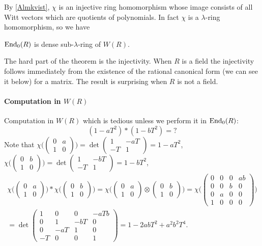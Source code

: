 By \ref{Almkvist}, $\chi$ is an injective ring homomorphism whose image consists of all Witt vectors which are quotients of polynomials. In fact $\chi$ is a $\lambda$-ring homomorphism, so we have
\begin{theorem}
	$\mathrm{End}_0(R)$ is dense sub-$\lambda$-ring of $W(R)$.
\end{theorem}
	The hard part of the theorem is the injectivity. When $R$ is a field the injectivity follows immediately from the existence of the rational canonical form (we can see it below) for a matrix. The result is surprising when $R$ is not a field.
\paragraph{Computation in $W(R)$}
Computation in $W(R)$ which is tedious unless we perform it in $\mathrm{End}_0(R)$:
\[(1-aT^2)*(1-bT^2)=?\]
Note that $\chi\Big(\begin{pmatrix}
	0&a \\1&0
\end{pmatrix}\Big)=\det \begin{pmatrix}
	1&-aT\\-T &1
\end{pmatrix} =1-aT^2$, $\chi\Big(\begin{pmatrix}
	0&b \\1&0
\end{pmatrix}\Big)=\det \begin{pmatrix}
	1&-bT\\-T &1
\end{pmatrix} =1-bT^2$,
\begin{gather*}
	\chi\Big(\begin{pmatrix}
	0&a \\1&0
\end{pmatrix}\Big)*\chi\Big(\begin{pmatrix}
	0&b \\1&0
\end{pmatrix}\Big)=\chi\Big(\begin{pmatrix}
	0&a \\1&0
\end{pmatrix}\otimes \begin{pmatrix}
	0&b \\1&0
\end{pmatrix} \Big)=\chi \Big(\begin{pmatrix}
	0 &0&0&ab\\0&0&b&0\\0&a&0&0\\1&0&0&0
\end{pmatrix}\Big)\\
=\det \begin{pmatrix}
	1 &0&0&-aTb\\0&1&-bT&0\\0&-aT&1&0\\-T&0&0&1
\end{pmatrix}=1-2abT^2+a^2b^2T^4.
\end{gather*}

